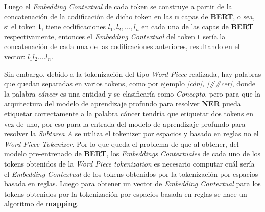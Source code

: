 Luego el \emph{Embedding Contextual} de cada token se construye a partir de la concatenaci\'on de la codificaci\'on de dicho token en las \textbf{n} capas de \textbf{BERT}, o sea, si el token \textbf{t}, tiene codificaciones $l_1, l_2, ..., l_n$ en cada una de las capas de \textbf{BERT} respectivamente, entonces el \emph{Embedding Contextual} del token \textbf{t} ser\'ia la concatenaci\'on de cada una de las codificaciones anteriores, resultando en el vector: $l_1l_2....l_n$.

Sin embargo, debido a la tokenizaci\'on del tipo \emph{Word Piece} realizada, hay palabras que quedan separadas en varios tokens, como por ejemplo \emph{[c\'an], [\#\#cer]}, donde la palabra \emph{c\'ancer} es una entidad y se clasificar\'ia como \emph{Concepto}, pero para que la arquitectura del modelo de aprendizaje profundo para resolver \textbf{NER} pueda etiquetar correctamente a la palabra c\'ancer tendr\'ia que etiquetar dos tokens en vez de uno, por eso para la entrada del modelo de aprendizaje profundo para resolver la \emph{Subtarea A} se utiliza el tokenizer por espacios y basado en reglas no el \emph{Word Piece Tokenizer}. Por lo que queda el problema de que al obtener, del modelo pre-entrenado de \textbf{BERT}, los \emph{Embeddings Contextuales} de cada uno de los tokens obtenidos de la \emph{Word Piece tokenization} es necesario computar cu\'al ser\'ia el \emph{Embedding Contextual} de los tokens obtenidos por la tokenizaci\'on por espacios basada en reglas. Luego para obtener un vector de \emph{Embedding Contextual} para los tokens obtenidos por la tokenizaci\'on por espacios basada en reglas se hace un algoritmo de \textbf{mapping}. 

